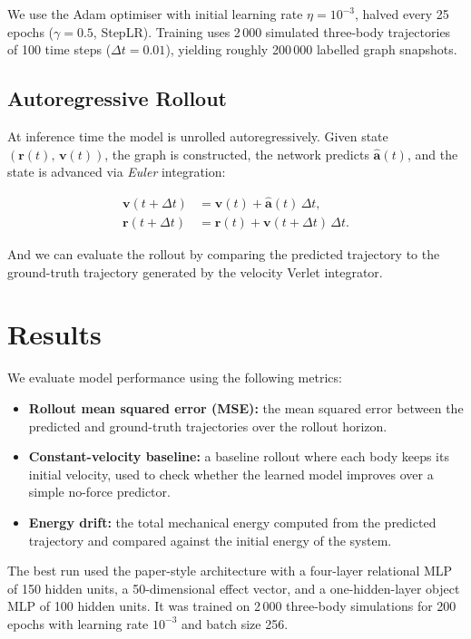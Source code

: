 \documentclass[11pt, a4paper]{article}
\begin{document}
We use the Adam optimiser with initial learning rate $\eta = 10^{-3}$, halved every 25 epochs
($\gamma = 0.5$, StepLR).
Training uses 2\,000 simulated three-body trajectories of 100 time steps ($\Delta t = 0.01$), yielding
roughly 200\,000 labelled graph snapshots.

\subsection{Autoregressive Rollout}

At inference time the model is unrolled autoregressively.
Given state $(\mathbf{r}(t),\,\mathbf{v}(t))$, the graph is constructed, the network predicts
$\hat{\mathbf{a}}(t)$, and the state is advanced via \emph{Euler} integration:

\begin{align}
    \mathbf{v}(t {+} \Delta t) &= \mathbf{v}(t) + \hat{\mathbf{a}}(t)\,\Delta t, \\
    \mathbf{r}(t {+} \Delta t) &= \mathbf{r}(t) + \mathbf{v}(t {+} \Delta t)\,\Delta t.
\end{align}

And we can evaluate the rollout by comparing the predicted trajectory to the ground-truth trajectory generated by the velocity Verlet integrator.


\section{Results}

We evaluate model performance using the following metrics:

\begin{itemize}
    \item \textbf{Rollout mean squared error (MSE):} the mean squared error between the predicted and ground-truth trajectories over the rollout horizon.
    \item \textbf{Constant-velocity baseline:} a baseline rollout where each body keeps its initial velocity, used to check whether the learned model improves over a simple no-force predictor.
    \item \textbf{Energy drift:} the total mechanical energy computed from the predicted trajectory and compared against the initial energy of the system.
\end{itemize}

The best run used the paper-style architecture with a four-layer relational MLP of 150 hidden units,
a 50-dimensional effect vector, and a one-hidden-layer object MLP of 100 hidden units.
It was trained on 2\,000 three-body simulations for 200 epochs with learning rate $10^{-3}$ and batch size 256.
\end{document}
